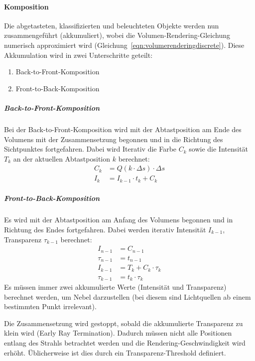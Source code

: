 			\paragraph{Komposition}
				Die abgetasteten, klassifizierten und beleuchteten Objekte werden nun zusammengeführt (akkumuliert), wobei die Volumen-Rendering-Gleichung numerisch approximiert wird (Gleichung~\ref{eqn:volumerenderingdiscrete}). Diese Akkumulation wird in zwei Unterschritte geteilt:
				\begin{enumerate}
					\item Back-to-Front-Komposition
					\item Front-to-Back-Komposition
				\end{enumerate}

				\subparagraph{Back-to-Front-Komposition}
					Bei der Back-to-Front-Komposition wird mit der Abtastposition am Ende des Volumens mit der Zusammensetzung begonnen und in die Richtung des Sichtpunktes fortgefahren. Dabei wird Iterativ die Farbe \( C_k \) sowie die Intensität \( T_k \) an der aktuellen Abtastposition \( k \) berechnet:
					\begin{align*}
						C_k &= Q(k \cdot \Delta s) \cdot \Delta s \\
						I_k &= I_{k - 1} \cdot t_k + C_k
					\end{align*}

				\subparagraph{Front-to-Back-Komposition}
					Es wird mit der Abtastposition am Anfang des Volumens begonnen und in Richtung des Endes fortgefahren. Dabei werden iterativ Intensität \( I_{k - 1} \), Transparenz \( \tau_{k - 1} \) berechnet:
					\begin{align*}
						I_{n - 1} &= C_{n - 1} \\
						\tau_{n - 1} &= t_{n - 1} \\
						I_{k - 1} &= T_k + C_k \cdot \tau_k \\
						\tau_{k - 1} &= t_k \cdot \tau_k
					\end{align*}
					Es müssen immer zwei akkumulierte Werte (Intensität und Transparenz) berechnet werden, um \zB Nebel darzustellen (bei diesem sind Lichtquellen ab einem bestimmten Punkt irrelevant).
					
					Die Zusammensetzung wird gestoppt, sobald die akkumulierte Transparenz zu klein wird (Early Ray Termination). Dadurch müssen nicht alle Positionen entlang des Strahls betrachtet werden und die Rendering-Geschwindigkeit wird erhöht. Üblicherweise ist dies durch ein Transparenz-Threshold definiert.

